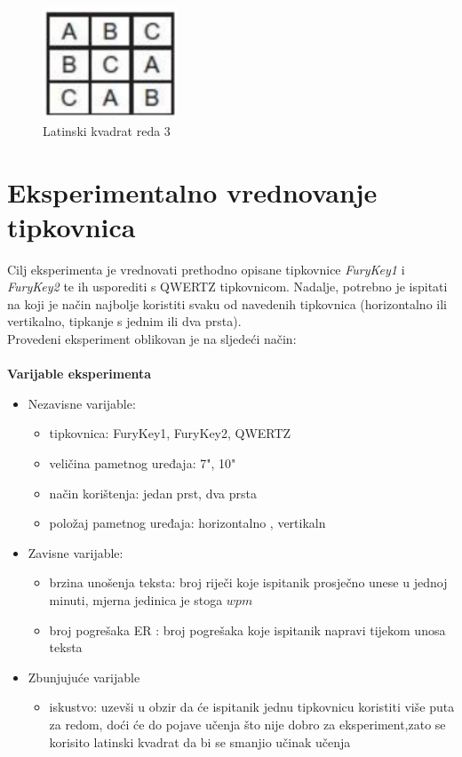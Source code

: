 \documentclass[times, utf8, zavrsni]{fer}
\begin{document}
\begin{figure}[htb]
\centering
\includegraphics[width=4cm]{img/latinski_kvadrat.png}
\caption{Latinski kvadrat reda 3}
\label{fig:latinski_kvadrat}
\end{figure}

\section{Eksperimentalno vrednovanje tipkovnica}
Cilj eksperimenta je vrednovati prethodno opisane tipkovnice \emph{FuryKey1} i \emph{FuryKey2} te ih usporediti s QWERTZ tipkovnicom. Nadalje, potrebno je ispitati na koji je način najbolje koristiti svaku od navedenih tipkovnica (horizontalno ili vertikalno, tipkanje s jednim ili dva prsta). \\
Provedeni eksperiment oblikovan je na sljedeći način:
\\\\\textbf{Varijable eksperimenta}
\begin{itemize}
\item Nezavisne varijable:
\begin{itemize}
\item tipkovnica: FuryKey1, FuryKey2, QWERTZ
\item veličina pametnog uređaja: 7", 10"
\item način korištenja: jedan prst, dva prsta
\item položaj pametnog uređaja: horizontalno , vertikaln 
\end{itemize}
\item Zavisne varijable:
\begin{itemize}
\item brzina unošenja teksta: broj riječi koje ispitanik prosječno unese u jednoj minuti, mjerna jedinica je stoga $wpm$ 
\item broj pogrešaka ER : broj pogrešaka koje ispitanik napravi tijekom unosa teksta
\end{itemize}
\item Zbunjujuće varijable
\begin{itemize}
\item iskustvo: uzevši u obzir da će ispitanik jednu tipkovnicu koristiti više puta za redom, doći će do pojave učenja što nije dobro za eksperiment,zato se korisito latinski kvadrat da bi se smanjio učinak učenja
\end{itemize}
\end{itemize}
\end{document}
